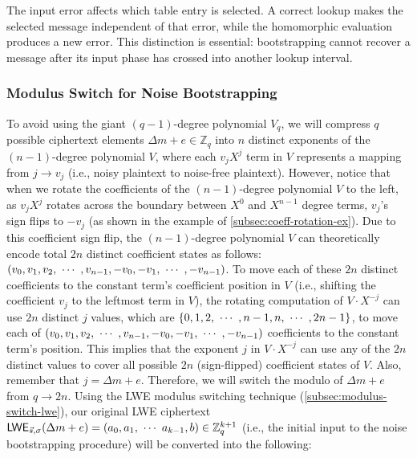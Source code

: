 The input error affects which table entry is selected. A correct lookup makes the selected message independent of that error, while the homomorphic evaluation produces a new error. This distinction is essential: bootstrapping cannot recover a message after its input phase has crossed into another lookup interval.

\subsubsection{Modulus Switch for Noise Bootstrapping}
\label{subsec:bootstrapping-modulus-switch}

To avoid using the giant $(q-1)$-degree polynomial $V_q$, we will compress $q$ possible ciphertext elements $\Delta m + e \in \mathbb{Z}_q$ into $n$ distinct exponents of the $(n-1)$-degree polynomial $V$, where each $v_jX^j$ term in $V$ represents a mapping from $j \rightarrow v_j$ (i.e., noisy plaintext to noise-free plaintext). However, notice that when we rotate the coefficients of the $(n-1)$-degree polynomial $V$ to the left, as $v_jX^j$ rotates across the boundary between $X^0$ and $X^{n-1}$ degree terms, $v_j$'s sign flips to $-v_j$ (as shown in the example of \autoref{subsec:coeff-rotation-ex}). Due to this coefficient sign flip, the $(n-1)$-degree polynomial $V$ can theoretically encode total $2n$ distinct coefficient states as follows: $(v_0, v_1, v_2, \text{ } \text{$\cdots$} \text{ }, v_{n-1}, -v_0, -v_1, \text{ } \text{$\cdots$} \text{ }, -v_{n-1})$. To move each of these $2n$ distinct coefficients to the constant term's coefficient position in $V$ (i.e., shifting the coefficient $v_j$ to the leftmost term in $V$), the rotating computation of $V \cdot X^{-j}$ can use $2n$ distinct $j$ values, which are $\{0, 1, 2, \text{ } \text{$\cdots$} \text{ }, n-1, n, \text{ } \text{$\cdots$} \text{ }, 2n-1\}$, to move each of $(v_0, v_1, v_2, \text{ } \text{$\cdots$} \text{ }, v_{n-1}, -v_0, -v_1, \text{ } \text{$\cdots$} \text{ }, -v_{n-1})$ coefficients to the constant term's position. This implies that the exponent $j$ in $V\cdot X^{-j}$ can use any of the $2n$ distinct values to cover all possible $2n$ (sign-flipped) coefficient states of $V$. Also, remember that $j = \Delta m + e$.  Therefore, we will switch the modulo of $\Delta m + e$ from $q \rightarrow 2n$. Using the LWE modulus switching technique (\autoref{subsec:modulus-switch-lwe}), our original LWE ciphertext $\textsf{LWE}_{\vec{s}, \sigma}(\Delta m + e) = ({a}_0, {a}_1, \text{ } \text{$\cdots$} \text{ } {a}_{k-1}, {b}) \in \mathbb{Z}_q^{k+1}$ (i.e., the initial input to the noise bootstrapping procedure) will be converted into the following: 

